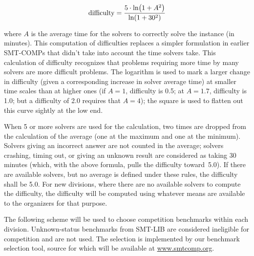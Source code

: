 \documentclass[12pt]{article}
\begin{document}
\[\mathrm{difficulty} = {5\cdot\ln\!\left(1+A^2\right) \over \ln\!\left(1+30^2\right)}\]

\noindent
where $A$ is the average time for the solvers to correctly solve the
instance (in minutes).  This computation of difficulties
replaces a simpler formulation in earlier SMT-COMPs that didn't take
into account the time solvers take.  This calculation of difficulty
recognizes that problems requiring more time by many solvers are
more difficult problems.  The logarithm is used to
mark a larger change in difficulty (given a corresponding increase in
solver average time) at smaller time scales than at higher ones (if $A=1$,
difficulty is 0.5; at $A=1.7$, difficulty is 1.0; but a difficulty of 2.0
requires that $A=4$); the square is used to flatten out this curve sightly
at the low end.  

When 5 or more solvers are used for the
calculation, two times are dropped from the calculation of the average
(one at the maximum and one at the minimum).  Solvers giving an
incorrect answer are not counted in the average; solvers crashing,
timing out, or giving an unknown result are considered as taking 30
minutes (which, with the above formula, pulls the difficulty
toward~5.0).  If there are available solvers, but no average is
defined under these rules, the difficulty shall be 5.0.  For new
divisions, where there are no available solvers to compute the
difficulty, the difficulty will be computed using whatever means are
available to the organizers for that purpose.

The following scheme will be used to choose competition benchmarks
within each division.  Unknown-status benchmarks from SMT-LIB are
considered ineligible for competition and are not used.
%
The selection
is implemented by our benchmark selection tool, source for which will
be available at \url{www.smtcomp.org}.
\end{document}
